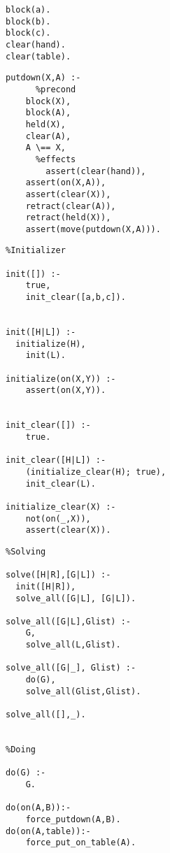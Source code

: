 \documentclass[12pt,titlepage]{article}
\begin{document}
\singlespacing
\begin{small}

\begin{verbatim}
block(a).
block(b).
block(c).
clear(hand).
clear(table).

\end{verbatim}


\bigskip

\begin{verbatim}
putdown(X,A) :-
      %precond
	block(X),
	block(A),
	held(X),
	clear(A),
	A \== X,
      %effects
        assert(clear(hand)),
	assert(on(X,A)),
	assert(clear(X)),
	retract(clear(A)),
	retract(held(X)),
	assert(move(putdown(X,A))).
\end{verbatim}

\bigskip

\begin{verbatim}
%Initializer

init([]) :-
	true,
	init_clear([a,b,c]).


init([H|L]) :-
  initialize(H),
	init(L).

initialize(on(X,Y)) :-
	assert(on(X,Y)).


init_clear([]) :-
	true.

init_clear([H|L]) :-
	(initialize_clear(H); true),
	init_clear(L).

initialize_clear(X) :-
	not(on(_,X)),
	assert(clear(X)).
\end{verbatim}

\bigskip

\begin{verbatim}
%Solving

solve([H|R],[G|L]) :-
  init([H|R]),
  solve_all([G|L], [G|L]).

solve_all([G|L],Glist) :-
	G,
	solve_all(L,Glist).

solve_all([G|_], Glist) :-
	do(G),
	solve_all(Glist,Glist).

solve_all([],_).


%Doing

do(G) :-
	G.

do(on(A,B)):-
	force_putdown(A,B).
do(on(A,table)):-
	force_put_on_table(A).
\end{verbatim}


\doublespacing
\end{small}
\end{document}
